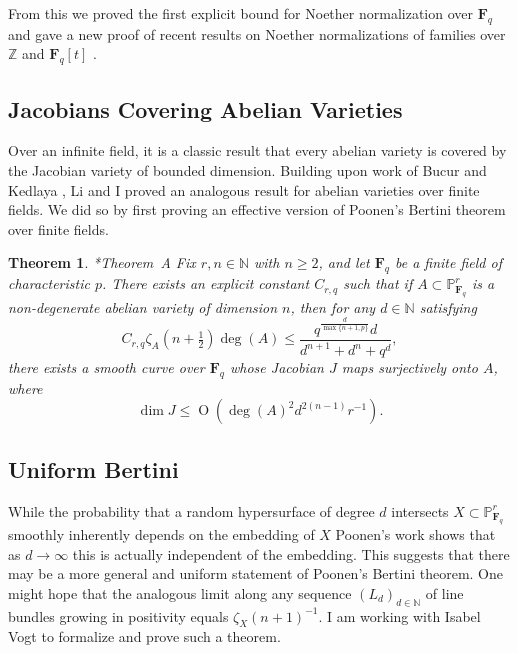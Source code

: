 \documentclass[11pt,reqno]{amsart}
\newtheorem{theorem}[lemma]{Theorem}
\theoremstyle{remark}
\newcommand{\fF}{\mathbf F}
\newcommand{\OO}{\operatorname{O}}
\newcommand{\N}{\mathbb{N}}
\renewcommand{\P}{\mathbb{P}}
\newcommand{\Z}{\mathbb{Z}}
\begin{document}
From this we proved the first explicit bound for Noether normalization over $\fF_{q}$ and gave a new proof of recent results on Noether normalizations of families over $\Z$ and $\fF_{q}[t]$ \cite{gabberLiuLorenzini15, cmbpt}.



\subsection{Jacobians Covering Abelian Varieties}

Over an infinite field, it is a classic result that every abelian variety is covered by the Jacobian variety of bounded dimension. Building upon work of Bucur and Kedlaya \cite{bucurKedlaya12}, Li and I proved an analogous result for abelian varieties over finite fields. We did so by first proving an effective version of Poonen's Bertini theorem over finite fields. 
\begin{theorem}\cite{bruceLi19}*{Theorem~A}
Fix $r,n\in \N$ with $n\geq2$, and let $\fF_{q}$ be a finite field of characteristic $p$. There exists an explicit constant $C_{r,q}$ such that if $A\subset \P^{r}_{\fF_q}$ is a non-degenerate abelian variety of dimension $n$, then for any $d\in \N$ satisfying 
\[
C_{r,q}\zeta_{A}\left(n+\tfrac{1}{2}\right) \deg(A) \leq  \frac{q^{\frac{d}{\max\{n+1,p\}}}d}{d^{n+1}+d^n+q^{d}},
\]
there exists a smooth curve over $\fF_{q}$ whose Jacobian $J$ maps surjectively onto $A$, where 
\[
\dim J\leq 
\OO\left( \deg(A)^2 d^{2(n-1)}r^{-1}\right).
\]
\end{theorem} 

\subsection{Uniform Bertini}

While the probability that a random hypersurface of degree $d$ intersects $X\subset \P^r_{\fF_{q}}$ smoothly inherently depends on the embedding of $X$ Poonen's work shows that as $d\to\infty$ this is actually independent of the embedding. 
This suggests that there may be a more general and uniform statement of Poonen's Bertini theorem. One might hope that the analogous limit along any sequence $(L_{d})_{d\in\N}$ of line bundles growing in positivity equals $\zeta_{X}(n+1)^{-1}$. I am working with Isabel Vogt to formalize and prove such a theorem.
\end{document}

